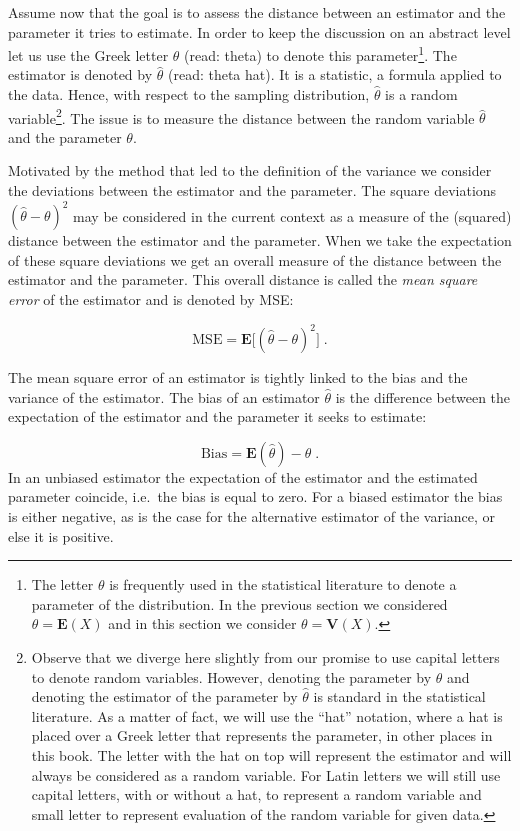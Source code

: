 \documentclass[]{krantz}
\newcommand{\Expec}{\mathbf{E}}
\newcommand{\Var}{\mathbf{V}}
\theoremstyle{definition}
\theoremstyle{definition}
\theoremstyle{definition}
\theoremstyle{remark}
\begin{document}
Assume now that the goal is to assess the distance between an estimator
and the parameter it tries to estimate. In order to keep the discussion
on an abstract level let us use the Greek letter \(\theta\) (read: theta)
to denote this parameter\footnote{The letter \(\theta\) is frequently used in the statistical
  literature to denote a parameter of the distribution. In the
  previous section we considered \(\theta = \Expec(X)\) and in this
  section we consider \(\theta=\Var(X)\).}. The estimator is denoted by \(\hat \theta\)
(read: theta hat). It is a statistic, a formula applied to the data.
Hence, with respect to the sampling distribution, \(\hat \theta\) is a
random variable\footnote{Observe that we diverge here slightly from our promise to use
  capital letters to denote random variables. However, denoting the
  parameter by \(\theta\) and denoting the estimator of the parameter by
  \(\hat \theta\) is standard in the statistical literature. As a matter
  of fact, we will use the ``hat'' notation, where a hat is placed over
  a Greek letter that represents the parameter, in other places in
  this book. The letter with the hat on top will represent the
  estimator and will always be considered as a random variable. For
  Latin letters we will still use capital letters, with or without a
  hat, to represent a random variable and small letter to represent
  evaluation of the random variable for given data.}. The issue is to measure the distance between the
random variable \(\hat \theta\) and the parameter \(\theta\).

Motivated by the method that led to the definition of the variance we
consider the deviations between the estimator and the parameter. The
square deviations \((\hat \theta - \theta)^2\) may be considered in the
current context as a measure of the (squared) distance between the
estimator and the parameter. When we take the expectation of these
square deviations we get an overall measure of the distance between the
estimator and the parameter. This overall distance is called the \emph{mean
square error} of the estimator and is denoted by MSE:

\[\mathrm{MSE} = \Expec\big[(\hat \theta - \theta)^2\big]\;.\]

The mean square error of an estimator is tightly linked to the bias and
the variance of the estimator. The bias of an estimator \(\hat \theta\) is
the difference between the expectation of the estimator and the
parameter it seeks to estimate:

\[\mathrm{Bias} = \Expec(\hat \theta) - \theta\;.\] In an unbiased
estimator the expectation of the estimator and the estimated parameter
coincide, i.e.~the bias is equal to zero. For a biased estimator the
bias is either negative, as is the case for the alternative estimator of
the variance, or else it is positive.
\end{document}
